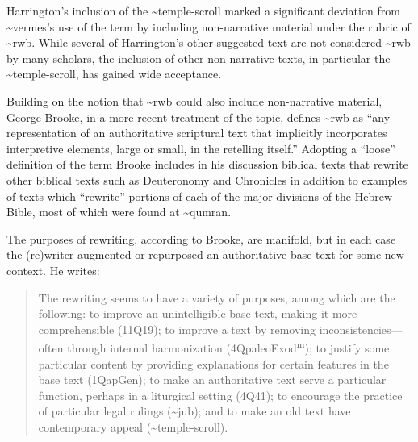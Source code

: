 Harrington's inclusion of the \textasciitilde{}temple-scroll marked a
significant deviation from \textasciitilde{}vermes's use of the term by
including non-narrative material under the rubric of
\textasciitilde{}rwb. While several of Harrington's other suggested text
are not considered \textasciitilde{}rwb by many scholars, the inclusion
of other non-narrative texts, in particular the
\textasciitilde{}temple-scroll, has gained wide
acceptance.\autocite{bernstein_textus2005}

Building on the notion that \textasciitilde{}rwb could also include
non-narrative material, George Brooke, in a more recent treatment of the
topic, defines \textasciitilde{}rwb as ``any representation of an
authoritative scriptural text that implicitly incorporates interpretive
elements, large or small, in the retelling
itself.''\autocite[777]{brooke_schiffman-vanderkam2000} Adopting a
``loose'' definition of the term Brooke includes in his discussion
biblical texts that rewrite other biblical texts such as Deuteronomy and
Chronicles in addition to examples of texts which ``rewrite'' portions
of each of the major divisions of the Hebrew Bible, most of which were
found at \textasciitilde{}qumran.\autocites[Brooke categorizes the texts
as follows: Reworked Pentateuchs, Rewritten Pentateuchal narratives,
Rewritten Pentateuchal laws, Rewritten Former Prophets, Rewritten Latter
Prophets, and Rewritten
Writings.][778--780]{brooke_schiffman-vanderkam2000}[See
also][]{brooke_herbert-tov2002}

The purposes of rewriting, according to Brooke, are manifold, but in
each case the (re)writer augmented or repurposed an authoritative base
text for some new context. He writes:

\begin{quote}
The rewriting seems to have a variety of purposes, among which are the
following: to improve an unintelligible base text, making it more
comprehensible (11Q19); to improve a text by removing
inconsistencies---often through internal harmonization
(4QpaleoExod\textsuperscript{m}); to justify some particular content by
providing explanations for certain features in the base text (1QapGen);
to make an authoritative text serve a particular function, perhaps in a
liturgical setting (4Q41); to encourage the practice of particular legal
rulings (\textasciitilde{}jub); and to make an old text have
contemporary appeal
(\textasciitilde{}temple-scroll).\autocite[778]{brooke_schiffman-vanderkam2000}
\end{quote}


